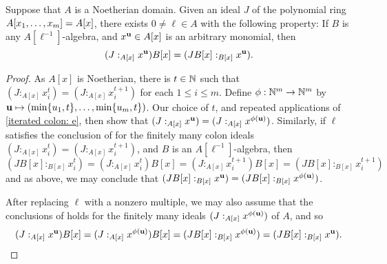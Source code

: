 \documentclass{amsart}
\begin{document}


\begin{corollary}
   \label{all monomial colons: C}
   Suppose that $A$ is a Noetherian domain. Given an ideal $J$ of the polynomial ring $A[x_1, \ldots, x_m] = A[x]$, there exists $0 \neq \ell \in A$ with the following property\textup:
   If $B$ is any $A[\ell^{-1}]$-algebra, and $x^{\mathbf{u}} \in A[x]$ is an arbitrary monomial, then \[ (J:_{A[x]} x^{\mathbf{u}}) B[x] = (JB[x]:_{B[x]} x^{\mathbf{u}}).\]
\end{corollary}

\begin{proof}
   As $A[x]$ is Noetherian, there is $t \in \mathbb{N}$ such that $(J:_{A[x]}x_i^t)=(J:_{A[x]}x_i^{t+1})$ for each $1 \leq i \leq m$.  Define $\phi:  \mathbb{N}^m \to \mathbb{N}^m$ by $\mathbf{u} \mapsto (\min\{u_1, t\}, \ldots, \min \{u_m,t\})$.  Our choice of $t$, and repeated applications of \eqref{iterated colon: e}, then show that $(J:_{A[x]}x^{\mathbf{u}}) = (J:_{A[x]}x^{\phi(\mathbf{u})})$.  Similarly, if $\ell$ satisfies the conclusion of  for the finitely many colon ideals $(J:_{A[x]}x_i^t)=(J:_{A[x]}x_i^{t+1})$, and $B$ is an $A[\ell^{-1}]$-algebra, then
   \[ (JB[x]:_{B[x]} x_i^{t}) = (J:_{A[x]}x_i^{t})B[x]
                               = (J:_{A[x]}x_i^{t+1})B[x]
                               =(JB[x]:_{B[x]} x_i^{t+1}) \]
   and as above, we may conclude that $(JB[x]:_{B[x]}x^{\mathbf{u}}) = (JB[x]:_{B[x]}x^{\phi(\mathbf{u})})$.

After replacing $\ell$ with a nonzero multiple, we may also assume that the conclusions of  holds for the finitely many ideals $(J:_{A[x]} x^{\phi(\mathbf{u})})$ of $A$, and so
%
\[ (J:_{A[x]} x^{\mathbf{u}})B[x] = (J:_{A[x]} x^{\phi(\mathbf{u})})B[x] = (JB[x]:_{B[x]} x^{\phi(\mathbf{u})}) = (JB[x]:_{B[x]} x^{\mathbf{u}}). \qedhere\]
\end{proof}
\end{document}
